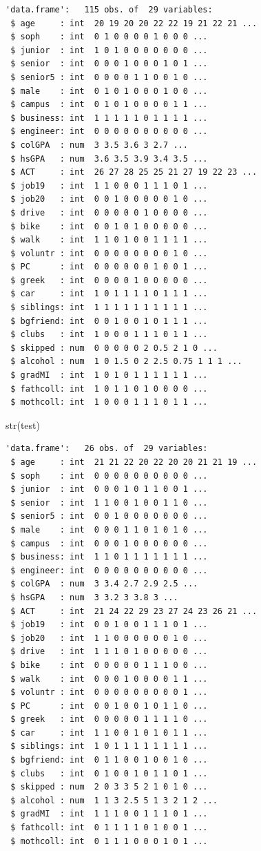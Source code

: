 \documentclass[
  letterpaper,
  DIV=11,
  numbers=noendperiod]{scrartcl}
\newenvironment{Shaded}{\begin{snugshade}}{\end{snugshade}}
\newcommand{\FunctionTok}[1]{\textcolor[rgb]{0.28,0.35,0.67}{#1}}
\newcommand{\NormalTok}[1]{\textcolor[rgb]{0.00,0.23,0.31}{#1}}
\begin{document}
\begin{verbatim}
'data.frame':   115 obs. of  29 variables:
 $ age     : int  20 19 20 20 22 22 19 21 22 21 ...
 $ soph    : int  0 1 0 0 0 0 1 0 0 0 ...
 $ junior  : int  1 0 1 0 0 0 0 0 0 0 ...
 $ senior  : int  0 0 0 1 0 0 0 1 0 1 ...
 $ senior5 : int  0 0 0 0 1 1 0 0 1 0 ...
 $ male    : int  0 1 0 1 0 0 0 1 0 0 ...
 $ campus  : int  0 1 0 1 0 0 0 0 1 1 ...
 $ business: int  1 1 1 1 1 0 1 1 1 1 ...
 $ engineer: int  0 0 0 0 0 0 0 0 0 0 ...
 $ colGPA  : num  3 3.5 3.6 3 2.7 ...
 $ hsGPA   : num  3.6 3.5 3.9 3.4 3.5 ...
 $ ACT     : int  26 27 28 25 25 21 27 19 22 23 ...
 $ job19   : int  1 1 0 0 0 1 1 1 0 1 ...
 $ job20   : int  0 0 1 0 0 0 0 0 1 0 ...
 $ drive   : int  0 0 0 0 0 1 0 0 0 0 ...
 $ bike    : int  0 0 1 0 1 0 0 0 0 0 ...
 $ walk    : int  1 1 0 1 0 0 1 1 1 1 ...
 $ voluntr : int  0 0 0 0 0 0 0 0 1 0 ...
 $ PC      : int  0 0 0 0 0 0 1 0 0 1 ...
 $ greek   : int  0 0 0 0 1 0 0 0 0 0 ...
 $ car     : int  1 0 1 1 1 1 0 1 1 1 ...
 $ siblings: int  1 1 1 1 1 1 1 1 1 1 ...
 $ bgfriend: int  0 0 1 0 0 1 0 1 1 1 ...
 $ clubs   : int  1 0 0 0 1 1 1 0 1 1 ...
 $ skipped : num  0 0 0 0 0 2 0.5 2 1 0 ...
 $ alcohol : num  1 0 1.5 0 2 2.5 0.75 1 1 1 ...
 $ gradMI  : int  1 0 1 0 1 1 1 1 1 1 ...
 $ fathcoll: int  1 0 1 1 0 1 0 0 0 0 ...
 $ mothcoll: int  1 0 0 0 1 1 1 0 1 1 ...
\end{verbatim}

\begin{Shaded}
\begin{Highlighting}[]
\FunctionTok{str}\NormalTok{(test)}
\end{Highlighting}
\end{Shaded}

\begin{verbatim}
'data.frame':   26 obs. of  29 variables:
 $ age     : int  21 21 22 20 22 20 20 21 21 19 ...
 $ soph    : int  0 0 0 0 0 0 0 0 0 0 ...
 $ junior  : int  0 0 0 1 0 1 1 0 0 1 ...
 $ senior  : int  1 1 0 0 1 0 0 1 1 0 ...
 $ senior5 : int  0 0 1 0 0 0 0 0 0 0 ...
 $ male    : int  0 0 0 1 1 0 1 0 1 0 ...
 $ campus  : int  0 0 0 1 0 0 0 0 0 0 ...
 $ business: int  1 1 0 1 1 1 1 1 1 1 ...
 $ engineer: int  0 0 0 0 0 0 0 0 0 0 ...
 $ colGPA  : num  3 3.4 2.7 2.9 2.5 ...
 $ hsGPA   : num  3 3.2 3 3.8 3 ...
 $ ACT     : int  21 24 22 29 23 27 24 23 26 21 ...
 $ job19   : int  0 0 1 0 0 1 1 1 0 1 ...
 $ job20   : int  1 1 0 0 0 0 0 0 1 0 ...
 $ drive   : int  1 1 1 0 1 0 0 0 0 0 ...
 $ bike    : int  0 0 0 0 0 1 1 1 0 0 ...
 $ walk    : int  0 0 0 1 0 0 0 0 1 1 ...
 $ voluntr : int  0 0 0 0 0 0 0 0 0 1 ...
 $ PC      : int  0 0 1 0 0 1 0 1 1 0 ...
 $ greek   : int  0 0 0 0 0 1 1 1 1 0 ...
 $ car     : int  1 1 0 0 1 0 1 0 1 1 ...
 $ siblings: int  1 0 1 1 1 1 1 1 1 1 ...
 $ bgfriend: int  0 1 1 0 0 1 0 0 1 0 ...
 $ clubs   : int  0 1 0 0 1 0 1 1 0 1 ...
 $ skipped : num  2 0 3 3 5 2 1 0 1 0 ...
 $ alcohol : num  1 1 3 2.5 5 1 3 2 1 2 ...
 $ gradMI  : int  1 1 1 0 0 1 1 1 0 1 ...
 $ fathcoll: int  0 1 1 1 1 0 1 0 0 1 ...
 $ mothcoll: int  0 1 1 1 0 0 0 1 0 1 ...
\end{verbatim}
\end{document}
